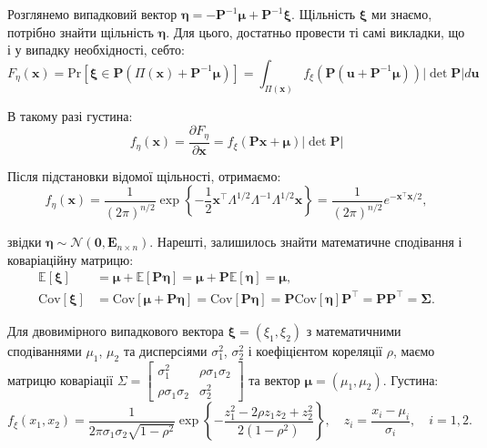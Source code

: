 \documentclass{../hw_template}
\begin{document}
Розглянемо випадковий вектор $\boldsymbol{\eta} = -\boldsymbol{P}^{-1}\boldsymbol{\mu} + \boldsymbol{P}^{-1}\boldsymbol{\xi}$. Щільність 
$\boldsymbol{\xi}$ ми знаємо, потрібно знайти щільність $\boldsymbol{\eta}$. Для цього, достатньо провести ті самі викладки, що 
і у випадку необхідності, себто:
\begin{equation*}
    F_{\eta}(\mathbf{x}) = \text{Pr}[\boldsymbol{\xi} \in \boldsymbol{P}(\Pi(\mathbf{x}) + \boldsymbol{P}^{-1}\boldsymbol{\mu})] = \int_{\Pi(\mathbf{x})} f_{\xi}(\boldsymbol{P}(\mathbf{u}+\boldsymbol{P}^{-1}\boldsymbol{\mu}))|\det \boldsymbol{P}|d\mathbf{u}
\end{equation*}

В такому разі густина:
\begin{equation*}
    f_{\eta}(\mathbf{x}) = \frac{\partial F_{\eta}}{\partial \mathbf{x}} = f_{\xi}(\boldsymbol{P}\mathbf{x}+\boldsymbol{\mu})|\det \boldsymbol{P}|
\end{equation*}

Після підстановки відомої щільності, отримаємо:
\begin{equation*}
    f_{\eta}(\mathbf{x}) = \frac{1}{(2\pi)^{n/2}}\exp\left\{-\frac{1}{2}\mathbf{x}^{\top}\Lambda^{1/2}\Lambda^{-1}\Lambda^{1/2}\mathbf{x}\right\} = \frac{1}{(2\pi)^{n/2}}e^{-\mathbf{x}^{\top}\mathbf{x}/2},
\end{equation*}

звідки $\boldsymbol{\eta} \sim \mathcal{N}(\mathbf{0}, \boldsymbol{E}_{n \times n})$. Нарешті, залишилось знайти математичне сподівання і коваріаційну матрицю:
\begin{align*}
    \mathbb{E}[\boldsymbol{\xi}] &= \boldsymbol{\mu} + \mathbb{E}[\boldsymbol{P\eta}] = \boldsymbol{\mu} + \boldsymbol{P}\mathbb{E}[\boldsymbol{\eta}] = \boldsymbol{\mu}, \\
    \text{Cov}[\boldsymbol{\xi}] &= \text{Cov}[\boldsymbol{\mu} + \boldsymbol{P}\boldsymbol{\eta}] = \text{Cov}[\boldsymbol{P\eta}] = \boldsymbol{P} \text{Cov}[\boldsymbol{\eta}] \boldsymbol{P}^{\top} = \boldsymbol{PP}^{\top} = \boldsymbol{\Sigma}.
\end{align*}

\begin{example}
    Для двовимірного випадкового вектора $\boldsymbol{\xi} = (\xi_1, \xi_2)$ з математичними 
    сподіваннями $\mu_1$, $\mu_2$ та дисперсіями $\sigma_1^2$, $\sigma_2^2$ і коефіцієнтом кореляції $\rho$, 
    маємо матрицю коваріації $\Sigma = \begin{bmatrix}
        \sigma_1^2 & \rho\sigma_1\sigma_2 \\
        \rho\sigma_1\sigma_2 & \sigma_2^2
    \end{bmatrix}$ та вектор $\boldsymbol{\mu} = (\mu_1,\mu_2)$. Густина:
    \begin{equation*}
        f_{\xi}(x_1,x_2) = \frac{1}{2\pi\sigma_1\sigma_2\sqrt{1-\rho^2}}\exp\left\{-\frac{z_1^2 - 2\rho z_1z_2 + z_2^2}{2(1-\rho^2)}\right\}, \quad z_i = \frac{x_i-\mu_i}{\sigma_i}, \quad i=1,2.
    \end{equation*}
\end{example}
\end{document}
